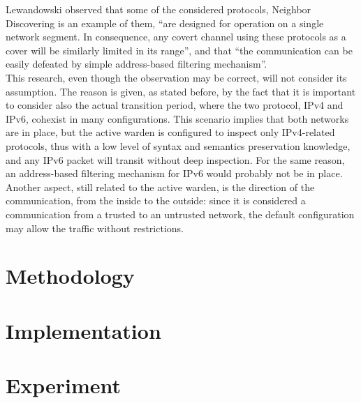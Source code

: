 \documentclass[12pt]{article}
\begin{document}
Lewandowski observed that some of the considered protocols, Neighbor Discovering is an example of them, ``are designed for operation on a single network segment. In consequence, any covert channel using these protocols 
as a cover will be similarly limited in its range'', and that ``the communication can be easily defeated by simple address-based filtering mechanism''.\\
This research, even though the observation may be correct,  will not consider its assumption. The reason is given, as stated before, by the fact that it is important to consider also the actual transition period, where 
the two protocol, IPv4 and IPv6, cohexist in many configurations. This scenario implies that both networks are in place, but the active warden is configured to inspect only IPv4-related protocols, thus with a low level of 
syntax and semantics preservation knowledge, and any IPv6 packet will transit without deep inspection. For the same reason, an address-based filtering mechanism for IPv6 would probably not be in place. Another aspect, 
still related to the active warden, is the direction of the communication, from the inside to the outside: since it is considered a communication from a trusted to an untrusted network, the default configuration may 
allow the traffic without restrictions.



\pagebreak

\section{Methodology}
\label{sec:3}

\pagebreak

\section{Implementation}
\label{sec:4}

\pagebreak

\section{Experiment}
\label{sec:5}

\pagebreak

\end{document}
